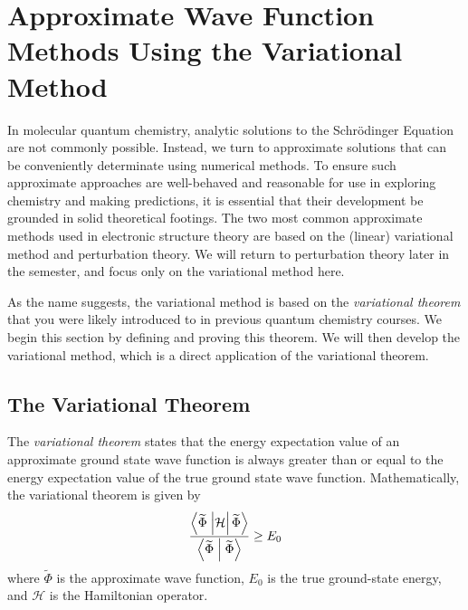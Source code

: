 \section{Approximate Wave Function Methods Using the Variational Method}
In molecular quantum chemistry, analytic solutions to the Schr\"{o}dinger Equation are not commonly possible. Instead, we turn to approximate solutions that can be conveniently determinate using numerical methods. To ensure such approximate approaches are well-behaved and reasonable for use in exploring chemistry and making predictions, it is essential that their development be grounded in solid theoretical footings. The two most common approximate methods used in electronic structure theory are based on the (linear) variational method and perturbation theory. We will return to perturbation theory later in the semester, and focus only on the variational method here.

As the name suggests, the variational method is based on the \emph{variational theorem} that you were likely introduced to in previous quantum chemistry courses. We begin this section by defining and proving this theorem. We will then develop the variational method, which is a direct application of the variational theorem.

\subsection{The Variational Theorem}
The \emph{variational theorem} states that the energy expectation value of an approximate ground state wave function is always greater than or equal to the energy expectation value of the true ground state wave function. Mathematically, the variational theorem is given by
%
\begin{equation}\label{Eq:variational_theorm_def}
  \displaystyle
  \frac{\braketop{\widetilde{\Phi}}{\mathcal{H}}{\widetilde{\Phi}}}{\braket{\widetilde{\Phi}}{\widetilde{\Phi}}} \ge{} E_0
\end{equation}
%
where $\widetilde{\Phi}$ is the approximate wave function, $E_0$ is the true ground-state energy, and $\mathcal{H}$ is the Hamiltonian operator.

